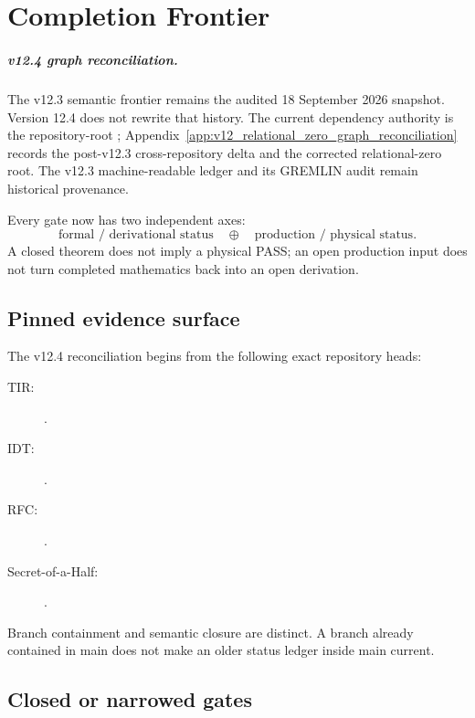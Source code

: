 \chapter{Completion Frontier}
\label{ch:v12_completion_frontier}

\paragraph{v12.4 graph reconciliation.}
The v12.3 semantic frontier remains the audited 18 September 2026 snapshot. Version 12.4 does not rewrite that history. The current dependency authority is the repository-root ; Appendix~\ref{app:v12_relational_zero_graph_reconciliation} records the post-v12.3 cross-repository delta and the corrected relational-zero root. The v12.3 machine-readable ledger and its GREMLIN audit remain historical provenance.

Every gate now has two independent axes:
\[
\boxed{
\text{formal / derivational status}
\quad\oplus\quad
\text{production / physical status}.
}
\]
A closed theorem does not imply a physical PASS; an open production input does
not turn completed mathematics back into an open derivation.

\section{Pinned evidence surface}

The v12.4 reconciliation begins from the following exact repository heads:
\begin{description}
\item[TIR:] .
\item[IDT:] .
\item[RFC:] .
\item[Secret-of-a-Half:] .
\end{description}

Branch containment and semantic closure are distinct. A branch already
contained in main does not make an older status ledger inside main current.

\section{Closed or narrowed gates}

